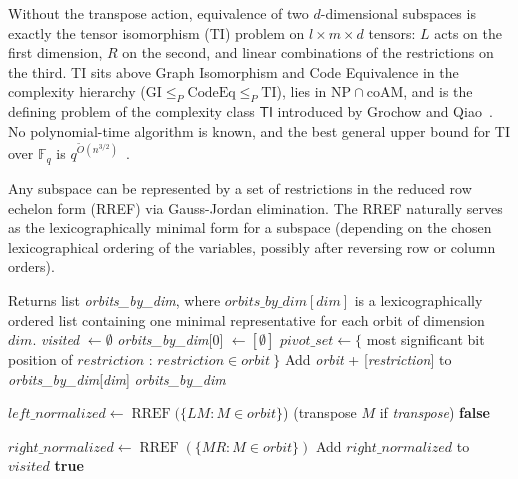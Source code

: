 \documentclass[11pt]{article}
\begin{document}
Without the transpose action, equivalence of two $d$-dimensional subspaces is exactly the tensor isomorphism (TI) problem on $l \times m \times d$ tensors: $L$ acts on the first dimension, $R$ on the second, and linear combinations of the restrictions on the third.
TI sits above Graph Isomorphism and Code Equivalence in the complexity hierarchy ($\mathrm{GI} \leq_P \mathrm{CodeEq} \leq_P \mathrm{TI}$), lies in $\mathrm{NP} \cap \mathrm{coAM}$, and is the defining problem of the complexity class $\mathsf{TI}$ introduced by Grochow and Qiao~\cite{grochow2023complexity}. No polynomial-time algorithm is known, and the best general upper bound for TI over $\mathbb{F}_q$ is $q^{\widetilde{O}(n^{3/2})}$~\cite{grochow2025complexity}.

Any subspace can be represented by a set of restrictions in the reduced row echelon form (RREF) via Gauss-Jordan elimination. The RREF naturally serves as the lexicographically minimal form for a subspace (depending on the chosen lexicographical ordering of the variables, possibly after reversing row or column orders).

\begin{algorithm}[H]
  \caption{Enumerate the orbits of restriction subspaces}
  \label{alg:enumerate-subspaces}
  \begin{algorithmic}[1]
    \Ensure Returns list \textit{orbits\_by\_dim}, where $\textit{orbits\_by\_dim}[\textit{dim}]$ is a lexicographically ordered list containing one minimal representative for each orbit of dimension $\textit{dim}$.
    \State \textit{visited} $\gets \emptyset$
    \State \textit{orbits\_by\_dim}[0] $\gets [\emptyset]$
    \State $\textit{pivot\_set} \gets \{$ most significant bit position of $\textit{restriction}$ : $\textit{restriction} \in \textit{orbit}\ \}$
    \State Add \textit{orbit} + [\textit{restriction}] to \textit{orbits\_by\_dim}[\textit{dim}]
    \EndIf
    \EndFor
    \EndFor
    \EndFor
    \State \Return \textit{orbits\_by\_dim}
    \Statex

    \State $\textit{left\_normalized} \gets \operatorname{RREF}(\{L M : M\in\textit{orbit}\}$) (transpose $M$ if \textit{transpose})
    \State \Return \textbf{false}
    \EndIf
    \EndParallelFor
    \EndParallelFor

    \State $\textit{right\_normalized} \gets \operatorname{RREF}(\{M R : M\in\textit{orbit}\})$
    \State Add $\textit{right\_normalized}$ to $\textit{visited}$
    \EndParallelFor
    \State \Return \textbf{true}
    \EndFunction
    \Statex
  \end{algorithmic}
\end{algorithm}
\end{document}
